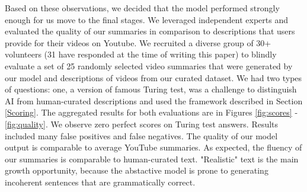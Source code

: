 \documentclass{article}
\begin{document}
Based on these observations, we decided that the model performed strongly enough for us move to the final stages. We leveraged  independent experts and evaluated the quality of our summaries in comparison to descriptions that users provide for their videos on Youtube. We recruited a diverse group of 30+ volunteers (31 have responded at the time of writing this paper) to blindly evaluate a set of 25 randomly selected video summaries  that were generated by our model and descriptions of videos from our curated dataset. We had two types of questions: one, a version of famous Turing test, was a challenge to distinguish AI from human-curated descriptions and used the framework described in Section \ref{Scoring}. The aggregated results for both evaluations are in Figures \ref{fig:scores} - \ref{fig:quality}. We observe zero perfect scores on Turing test answers. Results included many false positives and false negatives. The quality of our model output is comparable to average YouTube summaries. As expected, the fluency of our summaries is comparable to  human-curated text. "Realistic" text is the main growth opportunity, because the abstactive model is prone to generating incoherent sentences that are grammatically correct.
\end{document}

